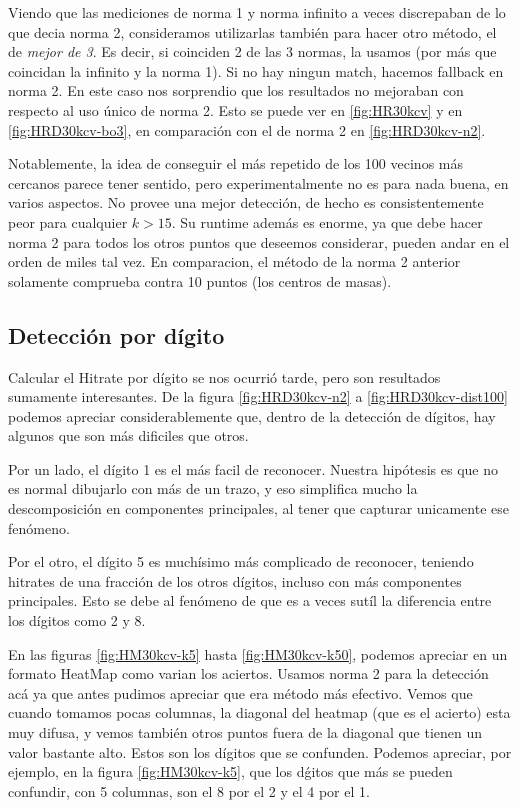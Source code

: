 Viendo que las mediciones de norma 1 y norma infinito a veces discrepaban de lo que
decia norma 2, consideramos utilizarlas tambi\'en para hacer otro m\'etodo, el de \textit{mejor
de 3}. Es decir, si coinciden 2 de las 3 normas, la usamos (por m\'as que coincidan la
infinito y la norma 1). Si no hay ningun match, hacemos fallback en norma 2. En este caso
nos sorprendio que los resultados no mejoraban con respecto al uso \'unico de norma 2.
Esto se puede ver en \ref{fig:HR30kcv} y en \ref{fig:HRD30kcv-bo3}, en comparaci\'on con
el de norma 2 en \ref{fig:HRD30kcv-n2}.

Notablemente, la idea de conseguir el m\'as repetido de los 100 vecinos m\'as cercanos
parece tener sentido, pero experimentalmente no es para nada buena, en varios aspectos.
No provee una mejor detecci\'on, de hecho es consistentemente peor para cualquier $k>15$.
Su runtime adem\'as es enorme, ya que debe hacer norma 2 para todos los otros puntos que
deseemos considerar, pueden andar en el orden de miles tal vez. En comparacion, el m\'etodo
de la norma 2 anterior solamente comprueba contra 10 puntos (los centros de masas).


\subsection{Detecci\'on por d\'igito}
Calcular el Hitrate por d\'igito se nos ocurri\'o tarde, pero son resultados
sumamente interesantes. De la figura \ref{fig:HRD30kcv-n2} a \ref{fig:HRD30kcv-dist100}
podemos apreciar considerablemente que, dentro de
la detecci\'on de d\'igitos, hay algunos que son m\'as dificiles que otros.

Por un lado, el d\'igito 1 es el m\'as facil de reconocer. Nuestra hip\'otesis
es que no es normal dibujarlo con m\'as de un trazo, y eso simplifica mucho la
descomposici\'on en componentes principales, al tener que capturar unicamente ese
fen\'omeno.

Por el otro, el d\'igito 5 es much\'isimo m\'as complicado de reconocer, teniendo
hitrates de una fracci\'on de los otros d\'igitos, incluso con m\'as componentes
principales. Esto se debe al fen\'omeno de que es a veces sut\'il la diferencia
entre los d\'igitos como 2 y 8.

En las figuras \ref{fig:HM30kcv-k5} hasta \ref{fig:HM30kcv-k50}, podemos apreciar
en un formato HeatMap como varian los aciertos. Usamos norma 2 para la detecci\'on ac\'a
ya que antes pudimos apreciar que era m\'etodo m\'as efectivo. Vemos que cuando tomamos pocas
columnas, la diagonal del heatmap (que es el acierto) esta muy difusa, y vemos tambi\'en
otros puntos fuera de la diagonal que tienen un valor bastante alto. Estos son los d\'igitos
que se confunden. Podemos apreciar, por ejemplo, en la figura \ref{fig:HM30kcv-k5}, que
los d\'gitos que m\'as se pueden confundir, con 5 columnas, son el 8 por el 2 y el 4 por el 1.

